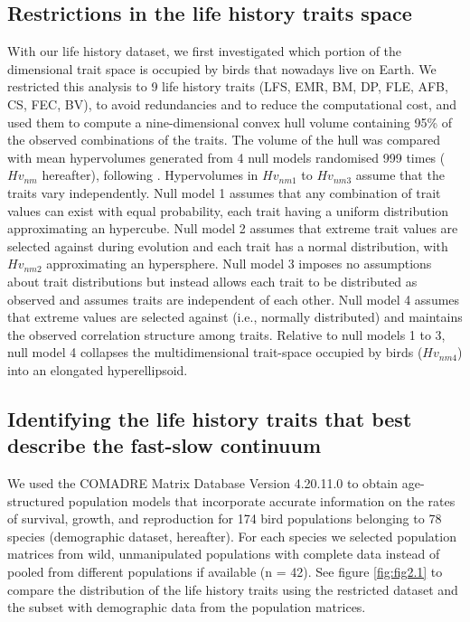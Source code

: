 \subsection*{Restrictions in the life history traits space}

With our life history dataset, we first investigated which portion of the 
dimensional trait space is occupied by birds that nowadays live on Earth. We 
restricted this analysis to 9 life history traits (LFS, EMR, BM, DP, FLE, 
AFB, CS, FEC, BV), to avoid redundancies and to reduce the computational cost, 
and used them to compute a nine-dimensional convex hull volume containing 95\% 
of the observed combinations of the traits. The volume of the hull 
was compared with mean hypervolumes generated from 4 null models randomised 
999 times ($Hv_{nm}$ hereafter), following \citet{Diaz2016}⁠.
Hypervolumes in $Hv_{nm1}$ to $Hv_{nm3}$ assume that the traits vary
independently. Null model 1 assumes that any combination of trait values can 
exist with equal probability, each trait having a uniform distribution 
approximating an hypercube. Null model 2 assumes that extreme trait values are 
selected against during evolution and each trait has a normal distribution, 
with $Hv_{nm2}$ approximating an hypersphere. Null model 3 imposes no
assumptions about trait distributions but instead allows each trait to be
distributed as observed and assumes traits are independent of each other. Null
model 4 assumes that extreme values are selected against (i.e., normally
distributed) and maintains the observed correlation structure among traits.
Relative to null models 1 to 3, null model 4 collapses the multidimensional
trait-space occupied by birds ($Hv_{nm4}$) into an elongated hyperellipsoid.


\subsection*{Identifying the life history traits that best describe the 
fast-slow continuum}

We used the COMADRE Matrix Database Version 4.20.11.0 
\citep{Salguero-Gomez2016} to obtain age-structured population models that 
incorporate accurate information on the rates of survival, growth, and 
reproduction for 174 bird populations belonging to 78 species (demographic 
dataset, hereafter). For each species we selected population matrices from 
wild, unmanipulated populations with complete data instead of pooled from 
different populations if available (n = 42). See figure \ref{fig:fig2.1} to 
compare the distribution of the life history traits using the restricted 
dataset and the subset with demographic data from the population matrices.

